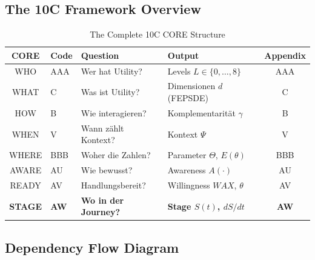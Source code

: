 \subsection{The 10C Framework Overview}

\begin{table}[htbp]
\centering
\caption{The Complete 10C CORE Structure}
\label{tab:10c-overview}
\renewcommand{\arraystretch}{1.4}
\begin{tabular}{@{}clllc@{}}
\toprule
\textbf{CORE} & \textbf{Code} & \textbf{Question} & \textbf{Output} & \textbf{Appendix} \\
\midrule
WHO & AAA & Wer hat Utility? & Levels $L \in \{0,\ldots,8\}$ & AAA \\
WHAT & C & Was ist Utility? & Dimensionen $d$ (FEPSDE) & C \\
HOW & B & Wie interagieren? & Komplementarität $\gamma$ & B \\
WHEN & V & Wann zählt Kontext? & Kontext $\Psi$ & V \\
WHERE & BBB & Woher die Zahlen? & Parameter $\Theta$, $E(\theta)$ & BBB \\
AWARE & AU & Wie bewusst? & Awareness $A(\cdot)$ & AU \\
READY & AV & Handlungsbereit? & Willingness $WAX$, $\theta$ & AV \\
\rowcolor{yellow!20}
\textbf{STAGE} & \textbf{AW} & \textbf{Wo in der Journey?} & \textbf{Stage $S(t)$, $dS/dt$} & \textbf{AW} \\
\bottomrule
\end{tabular}
\end{table}

\subsection{Dependency Flow Diagram}

